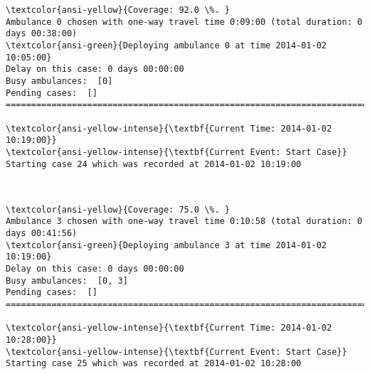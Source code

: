 \documentclass[11pt]{article}
\begin{document}
    \begin{Verbatim}[commandchars=\\\{\}]
\textcolor{ansi-yellow}{Coverage: 92.0 \%. }
Ambulance 0 chosen with one-way travel time 0:09:00 (total duration: 0 days 00:38:00)
\textcolor{ansi-green}{Deploying ambulance 0 at time 2014-01-02 10:05:00}
Delay on this case: 0 days 00:00:00
Busy ambulances:  [0]
Pending cases:  []
========================================================================

\textcolor{ansi-yellow-intense}{\textbf{Current Time: 2014-01-02 10:19:00}}
\textcolor{ansi-yellow-intense}{\textbf{Current Event: Start Case}}
Starting case 24 which was recorded at 2014-01-02 10:19:00

    \end{Verbatim}

    \begin{center}
    \end{center}
    { \hspace*{\fill} \\}
    
    \begin{Verbatim}[commandchars=\\\{\}]
\textcolor{ansi-yellow}{Coverage: 75.0 \%. }
Ambulance 3 chosen with one-way travel time 0:10:58 (total duration: 0 days 00:41:56)
\textcolor{ansi-green}{Deploying ambulance 3 at time 2014-01-02 10:19:00}
Delay on this case: 0 days 00:00:00
Busy ambulances:  [0, 3]
Pending cases:  []
========================================================================

\textcolor{ansi-yellow-intense}{\textbf{Current Time: 2014-01-02 10:28:00}}
\textcolor{ansi-yellow-intense}{\textbf{Current Event: Start Case}}
Starting case 25 which was recorded at 2014-01-02 10:28:00

    \end{Verbatim}

    \begin{center}
    \end{center}
    { \hspace*{\fill} \\}
    
\end{document}
